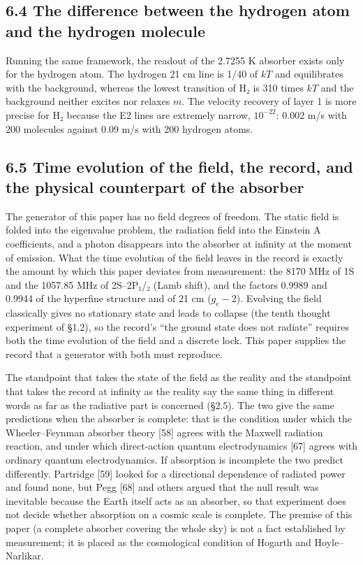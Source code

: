 \documentclass[
  a4paper,
]{article}
\newcounter{none} %
\begin{document}
\subsection{6.4 The difference between the hydrogen atom and the
hydrogen
molecule}\label{the-difference-between-the-hydrogen-atom-and-the-hydrogen-molecule}

Running the same framework, the readout of the 2.7255 K absorber exists
only for the hydrogen atom. The hydrogen 21 cm line is 1/40 of \(kT\)
and equilibrates with the background, whereas the lowest transition of
H₂ is 310 times \(kT\) and the background neither excites nor relaxes
\(m\). The velocity recovery of layer 1 is more precise for H₂ because
the E2 lines are extremely narrow, \(10^{-22}\): 0.002 m/s with 200
molecules against 0.09 m/s with 200 hydrogen atoms.

\subsection{6.5 Time evolution of the field, the record, and the
physical counterpart of the
absorber}\label{time-evolution-of-the-field-the-record-and-the-physical-counterpart-of-the-absorber}

The generator of this paper has no field degrees of freedom. The static
field is folded into the eigenvalue problem, the radiation field into
the Einstein A coefficients, and a photon disappears into the absorber
at infinity at the moment of emission. What the time evolution of the
field leaves in the record is exactly the amount by which this paper
deviates from measurement: the 8170 MHz of 1S and the 1057.85 MHz of
2S--2P₁/₂ (Lamb shift), and the factors 0.9989 and 0.9944 of the
hyperfine structure and of 21 cm (\(g_e-2\)). Evolving the field
classically gives no stationary state and leads to collapse (the tenth
thought experiment of §1.2), so the record's ``the ground state does not
radiate'' requires both the time evolution of the field and a discrete
lock. This paper supplies the record that a generator with both must
reproduce.

The standpoint that takes the state of the field as the reality and the
standpoint that takes the record at infinity as the reality say the same
thing in different words as far as the radiative part is concerned
(§2.5). The two give the same predictions when the absorber is complete:
that is the condition under which the Wheeler--Feynman absorber theory
{[}58{]} agrees with the Maxwell radiation reaction, and under which
direct-action quantum electrodynamics {[}67{]} agrees with ordinary
quantum electrodynamics. If absorption is incomplete the two predict
differently. Partridge {[}59{]} looked for a directional dependence of
radiated power and found none, but Pegg {[}68{]} and others argued that
the null result was inevitable because the Earth itself acts as an
absorber, so that experiment does not decide whether absorption on a
cosmic scale is complete. The premise of this paper (a complete absorber
covering the whole sky) is not a fact established by measurement; it is
placed as the cosmological condition of Hogarth and Hoyle--Narlikar.
\end{document}
